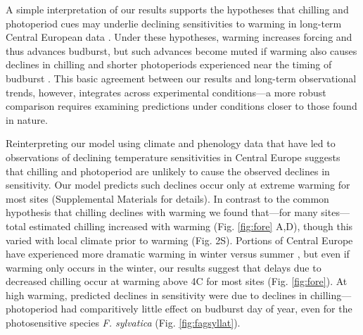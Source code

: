 \documentclass{article}
\begin{document}
\par A simple interpretation of our results supports the hypotheses that chilling and photoperiod cues may underlie declining sensitivities to warming in long-term Central European data \citep{Rutishauser:2008,yu2010,fu2015}. Under these hypotheses, warming increases forcing and thus advances budburst, but such advances become muted if warming also causes declines in chilling and shorter photoperiods experienced near the timing of budburst 
\citep{koerner2010a}. %
This basic agreement between our results and long-term observational trends, however, integrates across experimental conditions---a more robust comparison requires examining predictions under conditions closer to those found in nature.

\par Reinterpreting our model using climate and phenology data that have led to observations of declining temperature sensitivities in Central Europe suggests that chilling and photoperiod are unlikely to cause the observed declines in sensitivity. %
Our model predicts such declines occur only at extreme warming for most sites (Supplemental Materials for details). In contrast to the common hypothesis that chilling declines with warming we found that---for many sites---total estimated chilling increased with warming (Fig. \ref{fig:fore} A,D), though this varied with local climate prior to warming (Fig. 2S). 
Portions of Central Europe have experienced more dramatic warming in winter versus summer \citep{balling1998}, but even if warming only occurs in the winter, our results suggest that delays due to decreased chilling occur at warming above 4\degree C for most sites (Fig. \ref{fig:fore}). At high warming, predicted declines in sensitivity were due to declines in chilling---photoperiod had comparitively little effect on budburst day of year, even for the photosensitive species \emph{F. sylvatica} (Fig. \ref{fig:fagsyllat}). 
\end{document}
